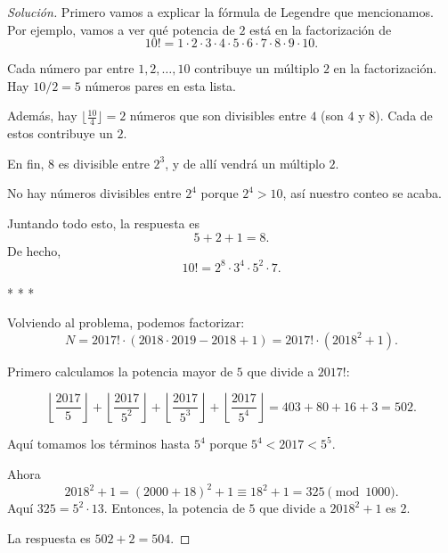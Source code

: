 \documentclass{article}
\theoremstyle{plain}
\newenvironment{solucion}{\begin{proof}[Solución]}{\end{proof}}
\begin{document}
\ifdefined\solutions
\begin{solucion}
    Primero vamos a explicar la fórmula de Legendre que mencionamos.
    Por ejemplo, vamos a ver qué potencia de $2$ está en la factorización de
    \[ 10! = 1\cdot 2\cdot 3\cdot 4\cdot 5\cdot 6\cdot 7\cdot 8\cdot 9\cdot 10. \]

    Cada número par entre $1, 2, \ldots, 10$ contribuye un múltiplo $2$ en
    la factorización. Hay $10/2 = 5$ números pares en esta lista.

    Además, hay $\lfloor\frac{10}{4}\rfloor = 2$ números que son divisibles
    entre $4$ (son $4$ y $8$). Cada de estos contribuye un $2$.

    En fin, $8$ es divisible entre $2^3$, y de allí vendrá un múltiplo $2$.

    No hay números divisibles entre $2^4$ porque $2^4 > 10$, así nuestro conteo
    se acaba.

    Juntando todo esto, la respuesta es
    \[ 5 + 2 + 1 = 8. \]
    De hecho,
    \[ 10! = 2^8\cdot 3^4\cdot 5^2\cdot 7. \]

    \begin{center}
        * * *
    \end{center}

    Volviendo al problema, podemos factorizar:
    \[ N = 2017! \cdot (2018\cdot 2019 - 2018 + 1) = 2017! \cdot (2018^2 + 1). \]

    Primero calculamos la potencia mayor de $5$ que divide a $2017!$:

    \[
        \left\lfloor\frac{2017}{5}\right\rfloor +
        \left\lfloor\frac{2017}{5^2}\right\rfloor +
        \left\lfloor\frac{2017}{5^3}\right\rfloor +
        \left\lfloor\frac{2017}{5^4}\right\rfloor =
        403 + 80 + 16 + 3 = 502.
    \]

    Aquí tomamos los términos hasta $5^4$ porque $5^4 < 2017 < 5^5$.

    Ahora
    \[ 2018^2 + 1 = (2000 + 18)^2 + 1 \equiv 18^2 + 1 = 325 \pmod{1000}. \]
    Aquí $325 = 5^2 \cdot 13$. Entonces, la potencia de $5$ que divide a
    $2018^2 + 1$ es $2$.

    La respuesta es $502 + 2 = 504$.
\end{solucion}
\fi
\end{document}
